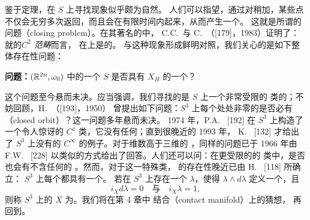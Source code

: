 鉴于\trRecurrence{}定理，在 $S$ 上寻找\trPeriodic{}现象似乎颇为自然。%
人们可以指望，通过对\trHamiltonianSystem{}稍加\trPerturbation，某些\trRecurrence{}点%
不仅会无穷多次返回，而且会在有限时间内\trClosing{}起来，从而产生一个\trPeriodicOrbit。%
这就是所谓的\trClosing{}问题（closing problem）。在其著名的\trClosingLemma{}中，%
C.C.~\trPugh{}与 C.~\trRobinson（[179]，1983）证明了：就\trHamiltonianFunction{}的\emph{$C^{2}$ 范畴}而言，%
\trPeriodicOrbit{}在\trCompact\trRegular\trEnergySurface{}上是\trGeneric\trDense{}的。%
与这种\trGeneric{}现象形成鲜明对照，我们关心的是如下整体存在性问题：

\noindent\textbf{问题：}$(\mathbb{R}^{2n},\omega_{0})$ 中的一个\trCompact\trRegular%
\trEnergySurface{} $S$ 是否具有\trHamiltonianVectorField{} $X_{H}$ 的一个\trPeriodicSolution？

这个问题至今悬而未决。应当强调，我们寻找的是 $S$ 上一个非常受限的%
\trVectorField{}类的\trPeriodicSolution；不妨回顾，H.~\trSeifert（[193]，1950）%
曾提出如下问题：$S^{3}$ 上每个处处非零的\trVectorField{}是否必有%
\textbf{\trClosed\trOrbit}（closed orbit）？这一问题多年悬而未决。%
1974 年，P.A.~\trSchweitzer{} [192] 在 $S^{3}$ 上构造了一个令人惊讶的%
$C^{1}$ 类\trVectorField，它没有任何\trPeriodicSolution；直到很晚近的 1993 年，%
K.~\trKuperberg{} [132] 才给出了 $S^{3}$ 上没有\trPeriodicSolution{}的%
$C^{\infty}$ \trVectorField{}的例子。对于维数高于三维的%
\trManifold{}，同样的问题已于 1966 年由 F.W.~\trWilson{} [228]%
以类似的方式给出了回答。人们还可以问：在更受限的\trMeasurePreserving{}的%
\trSmooth\trVectorField{}类中，是否也会有不含任何\trPeriodicSolution{}的%
\trVectorField。然而，对于\trReeb\trVectorField{}这一特殊类，%
\trClosed\trOrbit{}的存在性晚近已由 H.~\trHofer{} [118] 所确立：%
$S^{3}$ 上每个\trSmooth\trReeb\trVectorField{}都具有一个\trPeriodicOrbit。%
若在 $S^{3}$ 上存在一个\trOneForm{} $\lambda$，使得 $\lambda\wedge d\lambda$%
定义一个\trVolumeForm，且
\[
i_{X}d\lambda=0\quad\text{与}\quad i_{X}\lambda=1,
\]
则称 $S^{3}$ 上的\trVectorField{} $X$ 为\trReeb\trVectorField。我们将在第 4 章中%
结合\textbf{\trContact\trManifold}（contact manifold）上的\trWeinstein{}猜想，%
再回到\trReeb\trVectorField。

